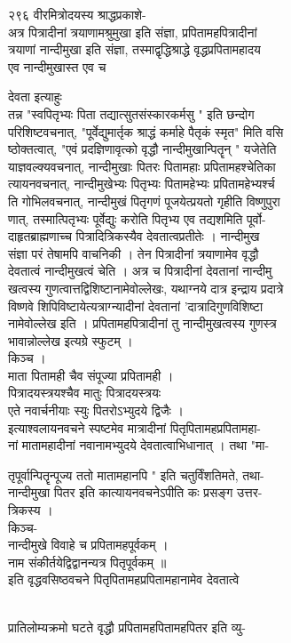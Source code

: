 \documentclass[11pt, openany]{book}
\begin{document}
{{{{{{२९६ वीरमित्रोदयस्य श्राद्धप्रकाशे-\\
अत्र पित्रादीनां त्रयाणामश्रुमुखा इति संज्ञा, प्रपितामहपित्रादीनां\\
त्रयाणां नान्दीमुखा इति संज्ञा, तस्माद्वृद्धिश्राद्धे
वृद्धप्रपितामहादय\\
एव नान्दीमुखास्त एव }{च}{ देवता इत्याहुः \textbar{}\\
तन्न \textbar{} "स्वपितृभ्यः पिता तद्यात्सुतसंस्कारकर्मसु " इति छन्दोग\\
परिशिष्टवचनात्, "पूर्वेद्युमार्तृक श्राद्धं कर्माहे पैतृकं स्मृत" मिति
वसि\\
ष्ठोक्तत्वात्, "एवं प्रदज्ञिणावृत्को वृद्धौ नान्दीमुखान्पितॄन् "
यजेतेति\\
याज्ञवल्क्यवचनात्, नान्दीमुखाः पितरः पितामहाः प्रपितामहश्चेतिका\\
त्यायनवचनात्, नान्दीमुखेभ्यः पितृभ्यः पितामहेभ्यः प्रपितामहेभ्यर्श्च\\
ति गोभिलवचनात्, नान्दीमुखं पितृगणं पूजयेत्प्रयतो गृहीति विष्णुपुरा\\
णात्, तस्मात्पितृभ्यः पूर्वेद्युः करोति पितृभ्य एव तद्यशमिति पूर्वो-\\
दाहृतब्राह्मणाच्च पित्रादित्रिकस्यैव देवतात्वप्रतीतेः । नान्दीमुख\\
संज्ञा परं तेषामपि वाचनिकी । तेन पित्रादीनां त्रयाणामेव वृद्धौ\\
देवतात्वं नान्दीमुखत्वं चेति । अत्र च पित्रादीनां देवतानां
नान्दीमु\\
खत्वस्य गुणत्वात्तद्विशिष्टानामेवोल्लेखः, यथाग्नये दात्र इन्द्राय
प्रदात्रे\\
विष्णवे शिपिविष्टायेत्यत्राग्न्यादीनां देवतानां 'दात्रादिगुणविशिष्टा\\
नामेवोल्लेख इति । प्रपितामहपित्रादीनां तु नान्दीमुखत्वस्य गुणस्त्र\\
भावान्नोल्लेख इत्यग्रे स्फुटम् ।\\
किञ्च ।\\
माता पितामही चैव संपूज्या प्रपितामही ।\\
पित्रादयस्त्रयश्चैव मातुः पित्रादयस्त्रयः \textbar{}\textbar{}\\
एते नवार्चनीयाः स्युः पितरोऽभ्युदये द्विजैः ।\\
इत्याश्वलायनवचने स्पष्टमेव मात्रादीनां पितृपितामहप्रपितामहा-\\
नां मातामहादीनां नवानामभ्युदये देवतात्वाभिधानात् । तथा "मा-

{तृपूर्वान्पितॄन्पूज्य ततो मातामहानपि " इति चतुर्विंशतिमते, तथा-\\
नान्दीमुखा पितर इति कात्यायनवचनेऽपीति कः प्रसङ्ग उत्तर-\\
त्रिकस्य ।\\
किञ्च-\\
नान्दीमुखे विवाहे }{च}{ प्रपितामहपूर्वकम् ।\\
नाम संकीर्तयेद्विद्वानन्यत्र पितृपूर्वकम् ॥\\
इति वृद्धवसिष्ठवचने पितृपितामहप्रपितामहानामेव }{देवतात्वे}{\\
प्रातिलोम्यक्रमो घटते वृद्धौ प्रपितामहपितामहपितर इति व्यु-

}}}}}}}
\end{document}
